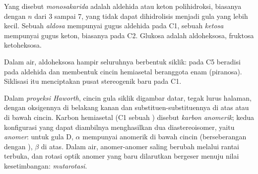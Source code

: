 \begin{definition}[Monosakarida]\label{def:b2:biomolecules:sugar}
Yang disebut \emph{monosakarida} adalah aldehida atau
keton polihidroksi, biasanya
 dengan $n$ dari 3 sampai 7, yang tidak dapat dihidrolisis
menjadi gula yang lebih kecil. Sebuah \emph{aldosa} mempunyai
gugus aldehida pada C1, sebuah \emph{ketosa} mempunyai gugus
keton, biasanya pada C2. Glukosa adalah aldoheksosa, fruktosa ketoheksosa.
\end{definition}

Dalam air, aldoheksosa hampir seluruhnya berbentuk siklik:  pada C5
beradisi pada aldehida dan membentuk cincin hemiasetal beranggota enam
(piranosa). Siklisasi itu menciptakan pusat stereogenik baru pada C1.

\begin{definition}[Anomer]\label{def:b2:biomolecules:anomer}
Dalam \emph{proyeksi Haworth}, cincin gula siklik
digambar datar, tegak lurus halaman, dengan oksigennya di belakang kanan dan
substituen-substituennya di atas atau di bawah cincin. Karbon hemiasetal
(C1 sebuah ) disebut \emph{karbon anomerik};
kedua konfigurasi yang dapat diambilnya menghasilkan dua diastereoisomer,
yaitu \emph{anomer}: untuk gula D,
$\alpha$ mempunyai  anomerik di bawah cincin (berseberangan dengan
), $\beta$ di atas. Dalam air, anomer-anomer saling berubah
melalui rantai terbuka, dan rotasi optik anomer yang baru dilarutkan
bergeser menuju nilai kesetimbangan: \emph{mutarotasi}.
\end{definition}


